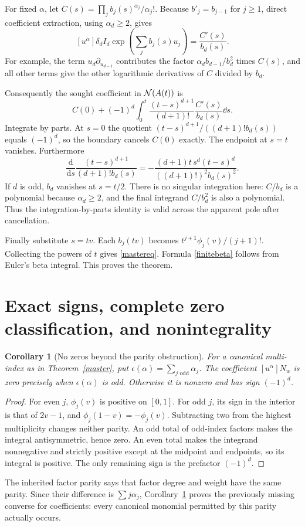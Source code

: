 \documentclass[11pt]{article}
\numberwithin{equation}{section}
\newtheorem{corollary}[theorem]{Corollary}
\theoremstyle{definition}\newtheorem{definition}[theorem]{Definition}
\theoremstyle{remark}\newtheorem{remark}[theorem]{Remark}
\begin{document}
For fixed $\alpha$, let $C(s)=\prod_j b_j(s)^{\alpha_j}/\alpha_j!$. Because $b'_j=b_{j-1}$ for $j\ge1$, direct coefficient extraction, using $\alpha_d\ge2$, gives
\begin{equation}\label{coeffderivative}
 [u^\alpha]\delta_d I_d\exp\left(\sum_j b_j(s)u_j\right)
 =\frac{C'(s)}{b_d(s)}.
\end{equation}
For example, the term $u_d\partial_{u_{d-1}}$ contributes the factor $\alpha_db_{d-1}/b_d^2$ times $C(s)$, and all other terms give the other logarithmic derivatives of $C$ divided by $b_d$.

Consequently the sought coefficient in $\mathcal N(A(t))$ is
\[
 C(0)+(-1)^d\int_0^t
 \frac{(t-s)^{d+1}}{(d+1)!}\frac{C'(s)}{b_d(s)}\dd s.
\]
Integrate by parts. At $s=0$ the quotient $(t-s)^{d+1}/((d+1)!b_d(s))$ equals $(-1)^d$, so the boundary cancels $C(0)$ exactly. The endpoint at $s=t$ vanishes. Furthermore
\[
 \frac{\mathrm d}{\mathrm ds}
 \frac{(t-s)^{d+1}}{(d+1)!b_d(s)}
 =-\frac{(d+1)t\,s^d(t-s)^d}{((d+1)!)^2b_d(s)^2}.
\]
If $d$ is odd, $b_d$ vanishes at $s=t/2$. There is no singular integration here: $C/b_d$ is a polynomial because $\alpha_d\ge2$, and the final integrand $C/b_d^2$ is also a polynomial. Thus the integration-by-parts identity is valid across the apparent pole after cancellation.

Finally substitute $s=tv$. Each $b_j(tv)$ becomes $t^{j+1}\phi_j(v)/(j+1)!$. Collecting the powers of $t$ gives \eqref{mastereq}. Formula \eqref{finitebeta} follows from Euler's beta integral. This proves the theorem.

\section{Exact signs, complete zero classification, and nonintegrality}
\begin{corollary}[No zeros beyond the parity obstruction]\label{sign}
For a canonical multi-index as in Theorem~\ref{master}, put
$\epsilon(\alpha)=\sum_{j\text{ odd}}\alpha_j$. The coefficient $[u^\alpha]N_w$ is zero precisely when $\epsilon(\alpha)$ is odd. Otherwise it is nonzero and has sign $(-1)^d$.
\end{corollary}
\begin{proof}
For even $j$, $\phi_j(v)$ is positive on $[0,1]$. For odd $j$, its sign in the interior is that of $2v-1$, and $\phi_j(1-v)=-\phi_j(v)$. Subtracting two from the highest multiplicity changes neither parity. An odd total of odd-index factors makes the integral antisymmetric, hence zero. An even total makes the integrand nonnegative and strictly positive except at the midpoint and endpoints, so its integral is positive. The only remaining sign is the prefactor $(-1)^d$.
\end{proof}
The inherited factor parity says that factor degree and weight have the same parity. Since their difference is $\sum j\alpha_j$, Corollary~\ref{sign} proves the previously missing converse for coefficients: every canonical monomial permitted by this parity actually occurs.
\end{document}
